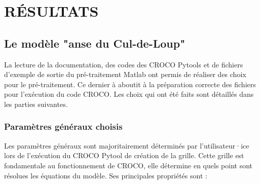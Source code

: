 \documentclass[10pt,a4paper,titlepage]{article}
\begin{document}


\newpage
\section{RÉSULTATS}
\label{sec:resultats}


\subsection{Le modèle "anse du Cul-de-Loup"}
\label{sub:modele_ADCL}




La lecture de la documentation, des codes des CROCO Pytools et de fichiers d'exemple de sortie du pré-traitement Matlab ont permis de réaliser des choix pour le pré-traitement.
Ce dernier à aboutit à la préparation correcte des fichiers pour l'exécution du code CROCO.
Les choix qui ont été faits sont détaillés dans les parties suivantes.


\subsubsection{Paramètres généraux choisis}
\label{subsub:param_generaux}

Les paramètres généraux sont majoritairement déterminés par l'utilisateur·ice lors de l'exécution du CROCO Pytool de création de la grille.
Cette grille est fondamentale au fonctionnement de CROCO, elle détermine en quels point sont résolues les équations du modèle. Ses principales propriétés sont :
\end{document}
